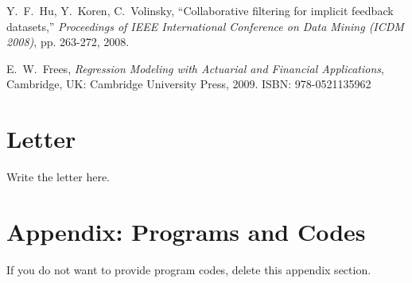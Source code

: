 \documentclass[12pt,a4paper]{article}
\begin{document}
\begin{spacing}{1.2}
\begin{thebibliography}{00}
Y.~F.~Hu, Y.~Koren, C.~Volinsky, ``Collaborative filtering for implicit feedback datasets,'' \textit{Proceedings of IEEE International Conference on Data Mining (ICDM 2008)}, pp. 263-272, 2008.

E.~W.~Frees, \textit{Regression Modeling with Actuarial and Financial Applications}, Cambridge, UK: Cambridge University Press, 2009. ISBN: 978-0521135962

\end{thebibliography}


\addtocounter{page}{-1}
\thispagestyle{empty}

\newpage
\addtocounter{page}{-1}
\thispagestyle{empty}

{\centering\section*{Letter}}

Write the letter here.



\end{spacing}


\newpage
\appendix
\addtocounter{page}{-1}
\thispagestyle{empty}



\section*{Appendix: Programs and Codes}

If you do not want to provide program codes, delete this appendix section.
\\

\end{document}
